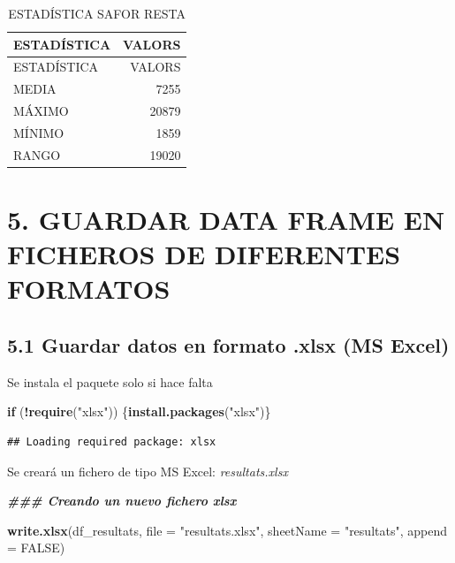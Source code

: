 \documentclass[
]{article}
\newenvironment{Shaded}{\begin{snugshade}}{\end{snugshade}}
\newcommand{\AttributeTok}[1]{\textcolor[rgb]{0.13,0.29,0.53}{#1}}
\newcommand{\ConstantTok}[1]{\textcolor[rgb]{0.56,0.35,0.01}{#1}}
\newcommand{\ControlFlowTok}[1]{\textcolor[rgb]{0.13,0.29,0.53}{\textbf{#1}}}
\newcommand{\DocumentationTok}[1]{\textcolor[rgb]{0.56,0.35,0.01}{\textbf{\textit{#1}}}}
\newcommand{\FunctionTok}[1]{\textcolor[rgb]{0.13,0.29,0.53}{\textbf{#1}}}
\newcommand{\NormalTok}[1]{#1}
\newcommand{\SpecialCharTok}[1]{\textcolor[rgb]{0.81,0.36,0.00}{\textbf{#1}}}
\newcommand{\StringTok}[1]{\textcolor[rgb]{0.31,0.60,0.02}{#1}}
\begin{document}
\begin{longtable}[]{@{}lr@{}}
\caption{ESTADÍSTICA SAFOR RESTA}\tabularnewline
\toprule\noalign{}
ESTADÍSTICA & VALORS \\
\midrule\noalign{}
\endfirsthead
\toprule\noalign{}
ESTADÍSTICA & VALORS \\
\midrule\noalign{}
\endhead
\bottomrule\noalign{}
\endlastfoot
MEDIA & 7255 \\
MÁXIMO & 20879 \\
MÍNIMO & 1859 \\
RANGO & 19020 \\
\end{longtable}

\hypertarget{guardar-data-frame-en-ficheros-de-diferentes-formatos}{%
\section{5. GUARDAR DATA FRAME EN FICHEROS DE DIFERENTES
FORMATOS}\label{guardar-data-frame-en-ficheros-de-diferentes-formatos}}

\hypertarget{guardar-datos-en-formato-.xlsx-ms-excel}{%
\subsection{5.1 Guardar datos en formato .xlsx (MS
Excel)}\label{guardar-datos-en-formato-.xlsx-ms-excel}}

Se instala el paquete solo si hace falta

\begin{Shaded}
\begin{Highlighting}[]
\ControlFlowTok{if}\NormalTok{ (}\SpecialCharTok{!}\FunctionTok{require}\NormalTok{(}\StringTok{"xlsx"}\NormalTok{)) \{}\FunctionTok{install.packages}\NormalTok{(}\StringTok{"xlsx"}\NormalTok{)\}}
\end{Highlighting}
\end{Shaded}

\begin{verbatim}
## Loading required package: xlsx
\end{verbatim}

Se creará un fichero de tipo MS Excel: \emph{resultats.xlsx}

\begin{Shaded}
\begin{Highlighting}[]
\DocumentationTok{\#\#\# Creando un nuevo fichero xlsx}

\FunctionTok{write.xlsx}\NormalTok{(df\_resultats, }\AttributeTok{file =} \StringTok{"resultats.xlsx"}\NormalTok{, }\AttributeTok{sheetName =} \StringTok{"resultats"}\NormalTok{, }\AttributeTok{append =} \ConstantTok{FALSE}\NormalTok{)}
\end{Highlighting}
\end{Shaded}
\end{document}
